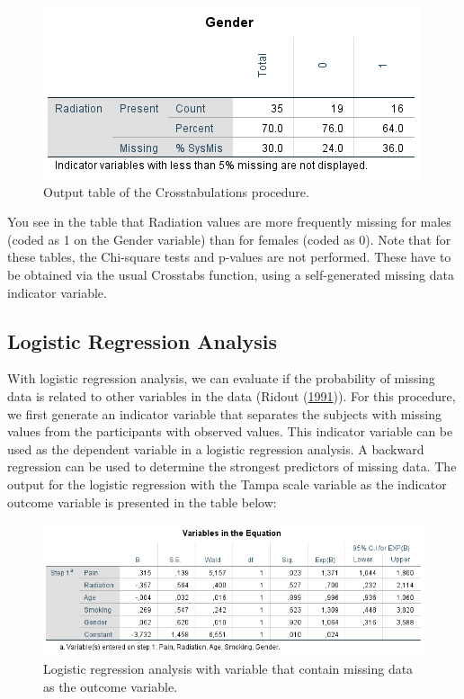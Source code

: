 \documentclass[
]{book}
\begin{document}
\begin{figure}

{\centering \includegraphics[width=0.7\linewidth]{images/Crosstabulation} 

}

\caption{Output table of the Crosstabulations procedure.}\label{fig:tab2-8}
\end{figure}

You see in the table that Radiation values are more frequently missing
for males (coded as 1 on the Gender variable) than for females (coded as
0). Note that for these tables, the Chi-square tests and p-values are
not performed. These have to be obtained via the usual Crosstabs
function, using a self-generated missing data indicator variable.

\hypertarget{logistic-regression-analysis}{%
\subsection{Logistic Regression
Analysis}\label{logistic-regression-analysis}}

With logistic regression analysis, we can evaluate if the probability of
missing data is related to other variables in the data (Ridout
(\protect\hyperlink{ref-Ridout1991}{1991})). For this procedure, we
first generate an indicator variable that separates the subjects with
missing values from the participants with observed values. This
indicator variable can be used as the dependent variable in a logistic
regression analysis. A backward regression can be used to determine the
strongest predictors of missing data. The output for the logistic
regression with the Tampa scale variable as the indicator outcome
variable is presented in the table below:

\begin{figure}

{\centering \includegraphics[width=0.9\linewidth]{images/tab2.6} 

}

\caption{Logistic regression analysis with variable that contain missing data as the outcome variable.}\label{fig:tab2-6}
\end{figure}
\end{document}
